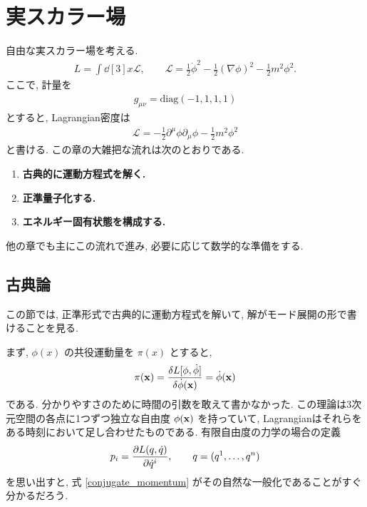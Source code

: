 \documentclass[../note01.tex]{subfiles}
\begin{document}
\section{実スカラー場}
自由な実スカラー場を考える.
\begin{align}\label{Lagrangian}
    L = \int\dd[3]{x} \mathcal{L}, \qquad
    \mathcal{L} = \frac{1}{2}\dot{\phi}^2 -\frac{1}{2}(\nabla\phi)^2 -\frac{1}{2}m^2\phi^2.
\end{align}
ここで, 計量を
\begin{align}
    g_{\mu\nu} = \mathrm{diag} (-1,1,1,1)
\end{align}
とすると, Lagrangian密度は
\begin{align}
    \mathcal{L} = -\frac{1}{2}\partial^\mu\phi\partial_\mu\phi - \frac{1}{2}m^2\phi^2
\end{align}
と書ける. この章の大雑把な流れは次のとおりである.
\begin{enumerate}
    \item \textbf{古典的に運動方程式を解く.}
    \item \textbf{正準量子化する.}
    \item \textbf{エネルギー固有状態を構成する.}
\end{enumerate}
他の章でも主にこの流れで進み, 必要に応じて数学的な準備をする.

\subsection{古典論}
この節では, 正準形式で古典的に運動方程式を解いて, 解がモード展開の形で書けることを見る.

まず, $ \phi(x) $ の共役運動量を $ \pi(x) $ とすると,
\begin{align}\label{conjugate_momentum}
    \pi(\vb{x}) = \fdv{L[\phi,\dot{\phi}]}{\dot{\phi}(\vb{x})} = \dot{\phi}(\vb{x})
\end{align}
である. 分かりやすさのために時間の引数を敢えて書かなかった.
この理論は3次元空間の各点に1つずつ独立な自由度 $ \phi(\vb{x}) $ を持っていて, Lagrangianはそれらをある時刻において足し合わせたものである.
有限自由度の力学の場合の定義
\begin{align*}
    p_i = \pdv{L(q,\dot{q})}{\dot{q}^i}, \qquad q=(q^1,\dots,q^n)
\end{align*}
を思い出すと, 式 \eqref{conjugate_momentum} がその自然な一般化であることがすぐ分かるだろう.
\end{document}
